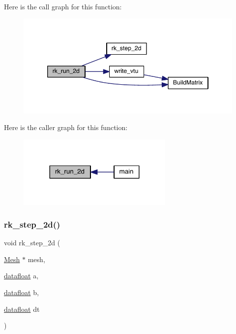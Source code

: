 Here is the call graph for this function\+:\nopagebreak
\begin{figure}[H]
\begin{center}
\leavevmode
\includegraphics[width=346pt]{a00554_a21a02761bc746f8e6205d02f662aee16_cgraph}
\end{center}
\end{figure}
Here is the caller graph for this function\+:\nopagebreak
\begin{figure}[H]
\begin{center}
\leavevmode
\includegraphics[width=216pt]{a00554_a21a02761bc746f8e6205d02f662aee16_icgraph}
\end{center}
\end{figure}
\mbox{\label{a00554_a9b253cfe04029e084b403542b0d7a64b}} 
\subsubsection{\texorpdfstring{rk\+\_\+step\+\_\+2d()}{rk\_step\_2d()}}
{\footnotesize\ttfamily void rk\+\_\+step\+\_\+2d (\begin{DoxyParamCaption}\item[{\hyperlink{a00557_aeffbe0891ab73a4d8964c9cb7978426e}{Mesh} $\ast$}]{mesh,  }\item[{\hyperlink{a00557_aa484d27c864c1a224505d8a302c0a4a4}{datafloat}}]{a,  }\item[{\hyperlink{a00557_aa484d27c864c1a224505d8a302c0a4a4}{datafloat}}]{b,  }\item[{\hyperlink{a00557_aa484d27c864c1a224505d8a302c0a4a4}{datafloat}}]{dt }\end{DoxyParamCaption})}

